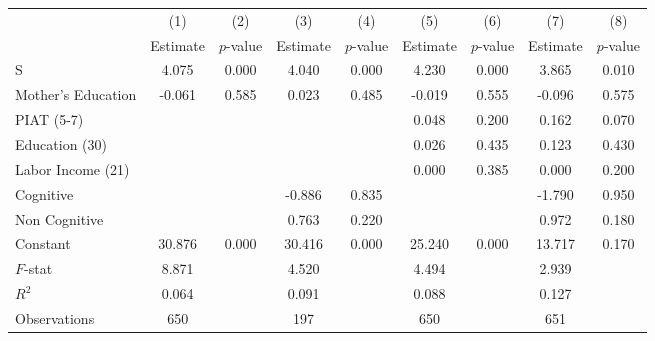 \begin{tabular}{lcccccccc} \toprule
 & (1) & (2) & (3) & (4) & (5) & (6) & (7) & (8)\\  
 & Estimate  & $p$-value  & Estimate  & $p$-value  & Estimate  & $p$-value  & Estimate  & $p$-value  \\  \midrule
S &     4.075 &     0.000 &     4.040 &     0.000 &     4.230 &     0.000 &     3.865 &     0.010 \\  
Mother's Education &    -0.061 &     0.585 &     0.023 &     0.485 &    -0.019 &     0.555 &    -0.096 &     0.575 \\  
PIAT (5-7) &         &         &         &         &     0.048 &     0.200 &     0.162 &     0.070 \\  
Education (30) &         &         &         &         &     0.026 &     0.435 &     0.123 &     0.430 \\  
Labor Income (21) &         &         &         &         &     0.000 &     0.385 &     0.000 &     0.200 \\  
Cognitive &         &         &    -0.886 &     0.835 &         &         &    -1.790 &     0.950 \\  
Non Cognitive &         &         &     0.763 &     0.220 &         &         &     0.972 &     0.180 \\  
Constant &    30.876 &     0.000 &    30.416 &     0.000 &    25.240 &     0.000 &    13.717 &     0.170 \\  \midrule
$F$-stat &     8.871 &         &     4.520 &         &     4.494 &         &     2.939 &         \\  
$R^2$ &     0.064 &         &     0.091 &         &     0.088 &         &     0.127 &          \\  
Observations &   650 &         &   197 &         &   650 &         &   651 &          \\  
\midrule \end{tabular}
